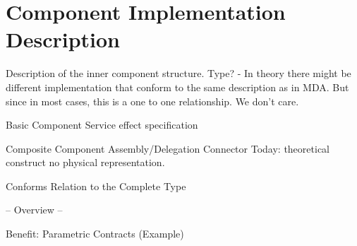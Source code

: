 \section{Component Implementation Description}
Description of the inner component structure. Type? -  In theory there might be different implementation that conform to the same description as in MDA. But since in most cases, this is a one to one relationship. We don't care.

Basic Component
Service effect specification

Composite Component
Assembly/Delegation Connector 
Today: theoretical construct no physical representation.

Conforms Relation to the Complete Type

-- Overview --

Benefit: Parametric Contracts (Example)
